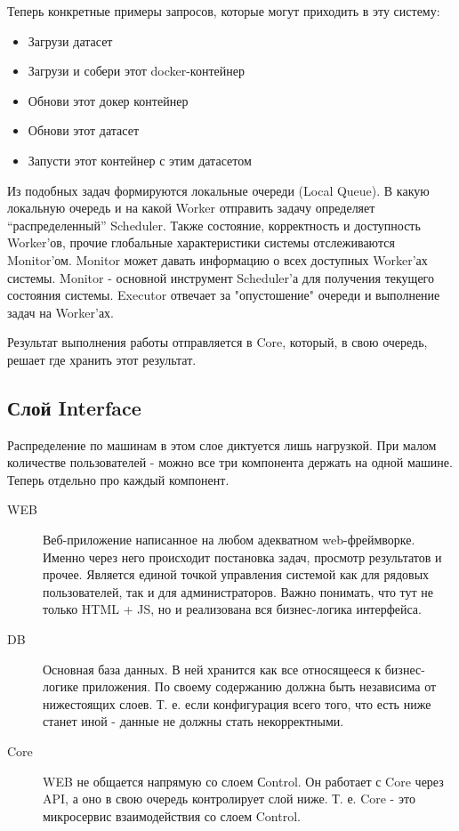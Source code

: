 Теперь конкретные примеры запросов, которые могут приходить в эту систему:

\begin{itemize}
	\item Загрузи датасет
	\item Загрузи и собери этот docker-контейнер
	\item Обнови этот докер контейнер
	\item Обнови этот датасет
	\item Запусти этот контейнер с этим датасетом
\end{itemize}

Из подобных задач формируются локальные очереди (Local Queue). В какую локальную очередь и на какой Worker отправить задачу определяет “распределенный” Scheduler. Также состояние, корректность и доступность Worker'ов, прочие глобальные характеристики системы отслеживаются Monitor'ом. Monitor может давать информацию о всех доступных Worker'ах системы. Monitor - основной инструмент Scheduler'а для получения текущего состояния системы. Executor отвечает за "опустошение" очереди и выполнение задач на Worker'ах.

Результат выполнения работы отправляется в Core, который, в свою очередь, решает где хранить этот результат.

\subsection{Слой Interface}

Распределение по машинам в этом слое диктуется лишь нагрузкой. При малом количестве пользователей - можно все три компонента держать на одной машине. Теперь отдельно про каждый компонент.

\begin{description}
  \item[WEB] Веб-приложение написанное на любом адекватном web-фреймворке. Именно через него происходит постановка задач, просмотр результатов и прочее. Является единой точкой управления системой как для рядовых пользователей, так и для администраторов. Важно понимать, что тут не только HTML + JS, но и реализована вся бизнес-логика интерфейса.
  \item[DB] Основная база данных. В ней хранится как все относящееся к бизнес-логике приложения. По своему содержанию должна быть независима от нижестоящих слоев. Т. е. если конфигурация всего того, что есть ниже станет иной - данные не должны стать некорректными.
  \item[Core] WEB не общается напрямую со слоем Сontrol. Он работает с Core через API, а оно в свою очередь контролирует слой ниже. Т. е. Core - это микросервис взаимодействия со слоем Control.
\end{description}


